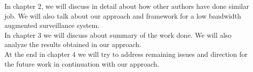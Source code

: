 \indent In chapter 2, we will discuss in detail about how other authors
have done similar job. We will also talk about our approach and
framework for a low bandwidth augmented surveillance system.\\

\indent In chapter 3 we will discuss about summary of the work done. We
will also analyze the results obtained in our approach.\\

\indent At the end in chapter 4 we will try to address remaining issues
and direction for the future work in continuation with our approach.\\

